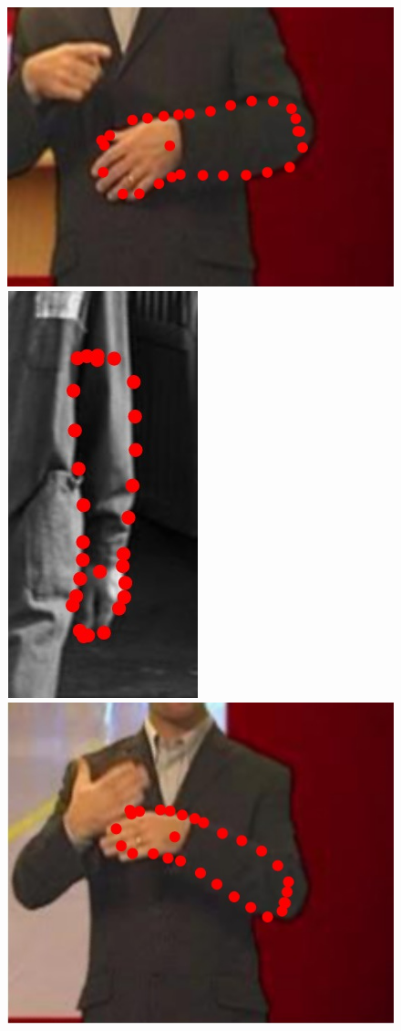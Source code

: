 \begin{figure}
    \hfill
    \includegraphics[height=\ofh]{resources/Annotation_Correction/Suplementory_Meterial/ExFit/0017}
    \hfill
    \includegraphics[height=\ofh]{resources/Annotation_Correction/Suplementory_Meterial/ExFit/0018}
    \hfill
    \includegraphics[height=\ofh]{resources/Annotation_Correction/Suplementory_Meterial/ExFit/0019}

\end{figure}
